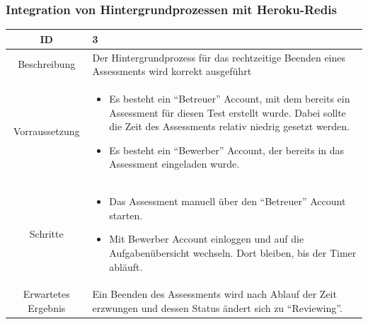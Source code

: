 \subsubsection{Integration von Hintergrundprozessen mit Heroku-Redis}
\begin{tabularx}{\textwidth}[H]{|c|X|}
    \hline
    ID & 3 \\ 
    \hline

    Beschreibung &
    Der Hintergrundprozess für das rechtzeitige Beenden eines Assessments wird korrekt ausgeführt
    \\ \hline

    Vorraussetzung &
    \begin{itemize}
        \item Es besteht ein \enquote{Betreuer} Account, mit dem bereits ein Assessment für diesen Test erstellt wurde.
              Dabei sollte die Zeit des Assessments relativ niedrig gesetzt werden.
        \item Es besteht ein \enquote{Bewerber} Account, der bereits in das Assessment eingeladen wurde.
    \end{itemize} \\ \hline

    Schritte &
    \begin{itemize}
        \item Das Assessment manuell über den \enquote{Betreuer} Account starten.
        \item Mit Bewerber Account einloggen und auf die Aufgabenübersicht wechseln. Dort bleiben, bis der Timer abläuft.
    \end{itemize}
    \\ \hline

    Erwartetes Ergebnis &
    Ein Beenden des Assessments wird nach Ablauf der Zeit erzwungen und dessen Status ändert sich zu \enquote{Reviewing}.
    \\ \hline
\end{tabularx}
